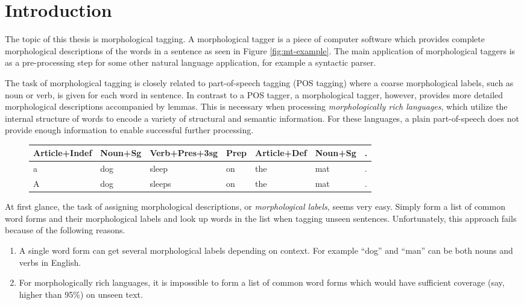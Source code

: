 \chapter{Introduction}
\label{ch:intro}

The topic of this thesis is morphological tagging. A morphological
tagger is a piece of computer software which provides complete
morphological descriptions of the words in a sentence as seen in
Figure \ref{fig:mt-example}. The main application of morphological
taggers is as a pre-processing step for some other natural language
application, for example a syntactic parser.

The task of morphological tagging is closely related to part-of-speech
tagging (POS tagging) where a coarse morphological labels, such as
noun or verb, is given for each word in sentence. In contrast to a POS
tagger, a morphological tagger, however, provides more detailed
morphological descriptions accompanied by lemmas. This is necessary
when processing {\it morphologically rich languages}, which utilize
the internal structure of words to encode a variety of structural and
semantic information. For these languages, a plain part-of-speech does
not provide enough information to enable successful further
processing.

\begin{figure}[!htb]
\begin{center}
\begin{tabular}{|l|l|l|l|l|l|l|}
\hline
Article+Indef & Noun+Sg & Verb+Pres+3sg & Prep & Article+Def & Noun+Sg & .\\  
\hline
a & dog & sleep & on & the & mat & .\\
\hline
A & dog & sleeps & on & the & mat & .\\
\hline
\end{tabular}
\end{center}
\end{figure}

At first glance, the task of assigning morphological descriptions, or
{\it morphological labels}, seems very easy. Simply form a list of
common word forms and their morphological labels and look up words in
the list when tagging unseen sentences. Unfortunately, this approach
fails because of the following reasons.

\begin{enumerate}
\item A single word form can get several morphological labels
  depending on context. For example ``dog'' and ``man'' can be both
  nouns and verbs in English.
\item For morphologically rich languages, it is impossible to form a
  list of common word forms which would have sufficient coverage (say,
  higher than 95\%) on unseen text.
\end{enumerate}

